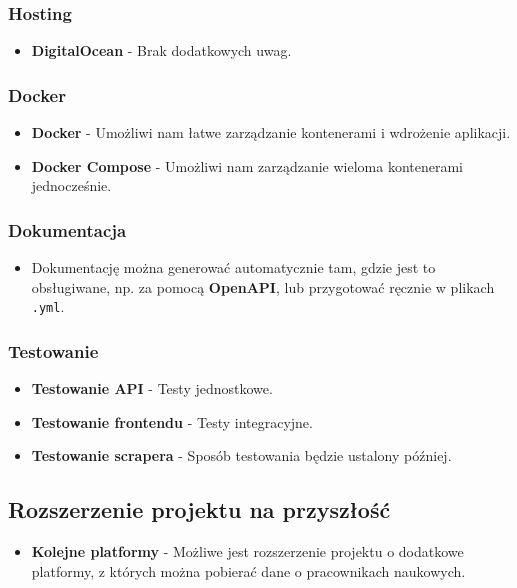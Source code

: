 \documentclass{article}
\begin{document}
\subsubsection{Hosting}
\begin{itemize}
  \item \textbf{DigitalOcean} - Brak dodatkowych uwag.
\end{itemize}

\subsubsection{Docker}
\begin{itemize}
  \item \textbf{Docker} - Umożliwi nam łatwe zarządzanie kontenerami i wdrożenie aplikacji.
  \item \textbf{Docker Compose} - Umożliwi nam zarządzanie wieloma kontenerami jednocześnie.
\end{itemize}

\subsubsection{Dokumentacja}
\begin{itemize}
  \item Dokumentację można generować automatycznie tam, gdzie jest to obsługiwane, np. za pomocą \textbf{OpenAPI}, lub przygotować ręcznie w plikach \texttt{.yml}.
\end{itemize}

\subsubsection{Testowanie}
\begin{itemize}
  \item \textbf{Testowanie API} - Testy jednostkowe.
  \item \textbf{Testowanie frontendu} - Testy integracyjne.
  \item \textbf{Testowanie scrapera} - Sposób testowania będzie ustalony później.
\end{itemize}

\subsection{Rozszerzenie projektu na przyszłość}
\begin{itemize}
  \item \textbf{Kolejne platformy} - Możliwe jest rozszerzenie projektu o dodatkowe platformy, z których można pobierać dane o pracownikach naukowych.
\end{itemize}
\end{document}
